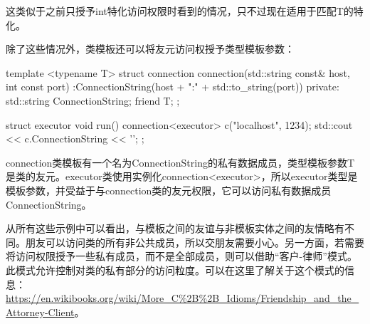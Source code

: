 这类似于之前只授予int特化访问权限时看到的情况，只不过现在适用于匹配T的特化。

除了这些情况外，类模板还可以将友元访问权授予类型模板参数：

\begin{cppcode}
template <typename T>
struct connection
{
	connection(std::string const& host, int const port)
		:ConnectionString(host + ":" + std::to_string(port))
	{}
private:
	std::string ConnectionString;
	friend T;
};

struct executor
{
	void run()
	{
		connection<executor> c("localhost", 1234);
		std::cout << c.ConnectionString << '\n';
	}
};
\end{cppcode}

connection类模板有一个名为ConnectionString的私有数据成员，类型模板参数T是类的友元。executor类使用实例化connection<executor>，所以executor类型是模板参数，并受益于与connection类的友元权限，它可以访问私有数据成员ConnectionString。
 
从所有这些示例中可以看出，与模板之间的友谊与非模板实体之间的友情略有不同。朋友可以访问类的所有非公共成员，所以交朋友需要小心。另一方面，若需要将访问权限授予一些私有成员，而不是全部成员，则可以借助“客户-律师”模式。此模式允许控制对类的私有部分的访问粒度。可以在这里了解关于这个模式的信息： \url{https://en.wikibooks.org/wiki/More_C%2B%2B_Idioms/Friendship_and_the_Attorney-Client}。


